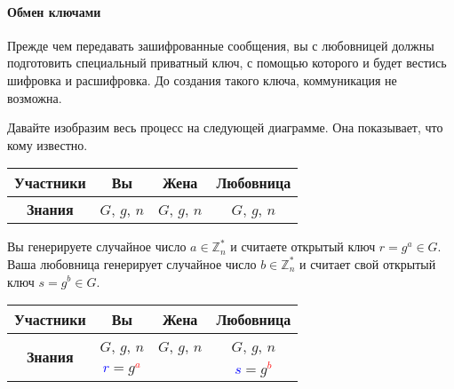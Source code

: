\paragraph{Обмен ключами}

Прежде чем передавать зашифрованные сообщения, вы с любовницей должны подготовить специальный приватный ключ, с помощью которого и будет вестись шифровка и расшифровка. До создания такого ключа, коммуникация не возможна.

Давайте изобразим весь процесс на следующей диаграмме. Она показывает, что кому известно.
\begin{center}
\begin{tabular}{|c|c|c|c|}
\hline
{\bf Участники}&{Вы}&{Жена}&{Любовница}\\
\hline
{\bf Знания}&{\textcolor{OliveGreen}{$G$}, \textcolor{OliveGreen}{$g$}, \textcolor{OliveGreen}{$n$}}&{\textcolor{OliveGreen}{$G$}, \textcolor{OliveGreen}{$g$}, \textcolor{OliveGreen}{$n$}}&{\textcolor{OliveGreen}{$G$}, \textcolor{OliveGreen}{$g$}, \textcolor{OliveGreen}{$n$}}\\
\hline
\end{tabular}
\end{center}

Вы генерируете случайное число $a\in \mathbb Z_n^*$ и считаете открытый ключ $r = g^a\in G$. Ваша любовница генерирует случайное число $b\in \mathbb Z_n^*$ и считает свой открытый ключ $s = g^b\in G$.
\begin{center}
\begin{tabular}{|c|c|c|c|}
\hline
{\bf Участники}&{Вы}&{Жена}&{Любовница}\\
\hline
\multirow{2}{*}{\bf Знания}&{\textcolor{OliveGreen}{$G$}, \textcolor{OliveGreen}{$g$}, \textcolor{OliveGreen}{$n$}}&{\textcolor{OliveGreen}{$G$}, \textcolor{OliveGreen}{$g$}, \textcolor{OliveGreen}{$n$}}&{\textcolor{OliveGreen}{$G$}, \textcolor{OliveGreen}{$g$}, \textcolor{OliveGreen}{$n$}}\\
{}&{ \textcolor{blue}{$r$}$=$\textcolor{OliveGreen}{$ g$}\textcolor{red}{${}^a$}}&{}&{ \textcolor{blue}{$s$}$=$\textcolor{OliveGreen}{$g$}\textcolor{red}{${}^b$}}\\
\hline
\end{tabular}
\end{center}

